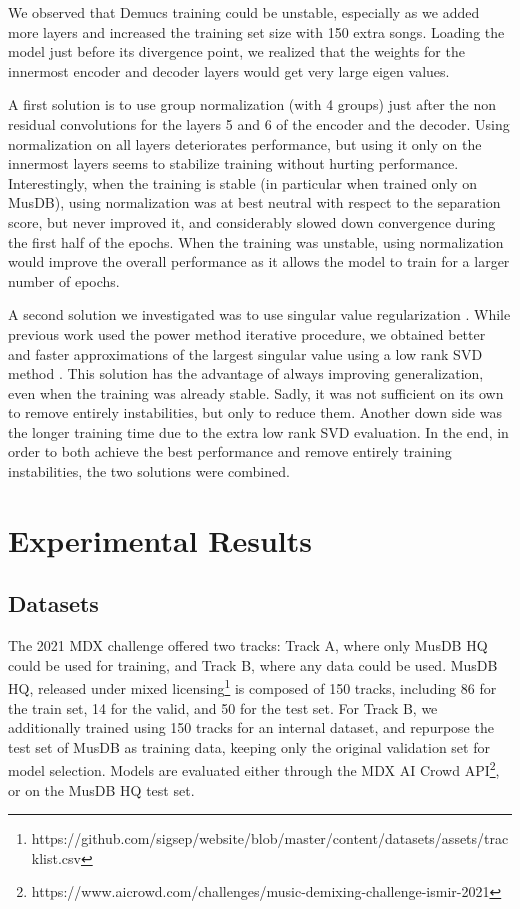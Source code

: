 \documentclass[10pt,a4paper,onecolumn]{article}
\begin{document}
We observed that Demucs training could be unstable, especially as we
added more layers and increased the training set size with 150 extra
songs. Loading the model just before its divergence point, we realized
that the weights for the innermost encoder and decoder layers would get
very large eigen values.

A first solution is to use group normalization (with 4 groups) just
after the non residual convolutions for the layers 5 and 6 of the
encoder and the decoder. Using normalization on all layers deteriorates
performance, but using it only on the innermost layers seems to
stabilize training without hurting performance. Interestingly, when the
training is stable (in particular when trained only on MusDB), using
normalization was at best neutral with respect to the separation score,
but never improved it, and considerably slowed down convergence during
the first half of the epochs. When the training was unstable, using
normalization would improve the overall performance as it allows the
model to train for a larger number of epochs.

A second solution we investigated was to use singular value
regularization \citep{spectral}. While previous work used the power
method iterative procedure, we obtained better and faster approximations
of the largest singular value using a low rank SVD method
\citep{lowranksvd}. This solution has the advantage of always improving
generalization, even when the training was already stable. Sadly, it was
not sufficient on its own to remove entirely instabilities, but only to
reduce them. Another down side was the longer training time due to the
extra low rank SVD evaluation. In the end, in order to both achieve the
best performance and remove entirely training instabilities, the two
solutions were combined.

\newpage

\hypertarget{experimental-results}{%
\section{Experimental Results}\label{experimental-results}}

\hypertarget{datasets}{%
\subsection{Datasets}\label{datasets}}

The 2021 MDX challenge \citep{mdx} offered two tracks: Track A, where
only MusDB HQ \citep{musdbhq} could be used for training, and Track B,
where any data could be used. MusDB HQ, released under mixed
licensing\footnote{https://github.com/sigsep/website/blob/master/content/datasets/assets/tracklist.csv}
is composed of 150 tracks, including 86 for the train set, 14 for the
valid, and 50 for the test set. For Track B, we additionally trained
using 150 tracks for an internal dataset, and repurpose the test set of
MusDB as training data, keeping only the original validation set for
model selection. Models are evaluated either through the MDX AI Crowd
API\footnote{https://www.aicrowd.com/challenges/music-demixing-challenge-ismir-2021},
or on the MusDB HQ test set.
\end{document}
